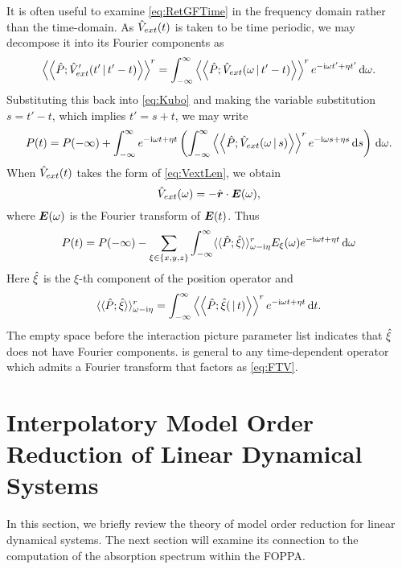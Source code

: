 It is often useful to examine \cref{eq:RetGFTime} in the frequency domain rather than the time-domain. As $\hat{V}_{ext}(t)$ is
taken to be time periodic, we may decompose it into its Fourier components as
\begin{equation}
  \left \langle \left \langle \hat{P}; \hat{V}'_{ext}(t' \,\vert\, t'-t) \right\rangle \right\rangle^r = \int_{-\infty}^\infty \left \langle \left \langle \hat{P}; \hat{V}_{ext}(\omega \,\vert\, t'-t) \right\rangle \right\rangle^r e^{-\mathrm i \omega t' + \eta t'}\,\mathrm{d}\omega.
\end{equation}
Substituting this back into \cref{eq:Kubo} and making the variable substitution $s = t' - t$, which implies $t' = s + t$, we may write
\begin{equation}
P(t) = P(-\infty) +\int_{-\infty}^\infty  e^{-\mathrm i \omega t + \eta t} \left(\int_{-\infty}^\infty \left \langle \left \langle \hat{P}; \hat{V}_{ext}(\omega \,\vert\, s) \right\rangle \right\rangle^r 
e^{-\mathrm i \omega s + \eta s} \,\mathrm{d} s\right)
\,\mathrm{d} \omega.
\end{equation}
When $\hat{V}_{ext}(t)$ takes the form of \cref{eq:VextLen}, we obtain 
\begin{equation}
\label{eq:FTV}
\hat{V}_{ext}(\omega) = -\hat{\boldsymbol{r}} \cdot \boldsymbol{E}(\omega),
\end{equation}
where $\boldsymbol{E}(\omega)$ is the Fourier transform of $\boldsymbol{E}(t)$. Thus
\begin{equation}
\label{eq:FTResponse}
P(t) = P(-\infty) - \sum_{\xi \in \{x,y,z\}} \int_{-\infty}^\infty \langle \langle \hat{P}; \hat{\xi} \rangle \rangle^r_{\omega - \mathrm i\eta} E_\xi(\omega) e^{-\mathrm i\omega t + \eta t} \,\mathrm{d}\omega 
\end{equation}
Here $\hat{\xi}$ is the $\xi$-th component of the position operator and
\begin{equation}
\label{eq:RetGFFT}
\langle \langle \hat{P}; \hat{\xi} \rangle \rangle^r_{\omega - \mathrm i\eta} = \int_{-\infty}^\infty \left \langle \left \langle \hat{P}; \hat{\xi} ( \,\vert\, t) \right\rangle \right\rangle^r e^{-\mathrm i \omega t + \eta t} \,\mathrm{d} t.
\end{equation}
The empty space before the interaction picture parameter list indicates that $\hat{\xi}$ does not have Fourier components.  is general
to any time-dependent operator which admits a Fourier transform that factors as \cref{eq:FTV}.






\section{Interpolatory Model Order Reduction of Linear Dynamical Systems}
\label{lds:dyn-sys}

In this section, we briefly review the theory of model order reduction for
linear dynamical systems. The next section will examine its connection to the
computation of the absorption spectrum within the FOPPA.


